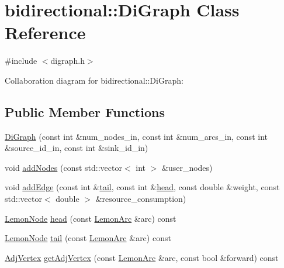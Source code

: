 \hypertarget{classbidirectional_1_1DiGraph}{}\section{bidirectional\+:\+:Di\+Graph Class Reference}
\label{classbidirectional_1_1DiGraph}


{\ttfamily \#include $<$digraph.\+h$>$}



Collaboration diagram for bidirectional\+:\+:Di\+Graph\+:
\subsection*{Public Member Functions}
\begin{DoxyCompactItemize}
\item 
\hyperlink{classbidirectional_1_1DiGraph_a8c15d18a0760e40039441081aa88a51b}{Di\+Graph} (const int \&num\+\_\+nodes\+\_\+in, const int \&num\+\_\+arcs\+\_\+in, const int \&source\+\_\+id\+\_\+in, const int \&sink\+\_\+id\+\_\+in)
\item 
void \hyperlink{classbidirectional_1_1DiGraph_a483c50e9b5b483472ae7ee2910f3bcda}{add\+Nodes} (const std\+::vector$<$ int $>$ \&user\+\_\+nodes)
\item 
void \hyperlink{classbidirectional_1_1DiGraph_acc46372f63c1736a81a11b6b533c564b}{add\+Edge} (const int \&\hyperlink{classbidirectional_1_1DiGraph_a0be9d9f87409f523306babcfef8a7f46}{tail}, const int \&\hyperlink{classbidirectional_1_1DiGraph_aa0379cf603a76b85a8ef3ca5ad03d4af}{head}, const double \&weight, const std\+::vector$<$ double $>$ \&resource\+\_\+consumption)
\item 
\hyperlink{digraph_8h_a952c6b935f7521c3435dbd13b255246b}{Lemon\+Node} \hyperlink{classbidirectional_1_1DiGraph_aa0379cf603a76b85a8ef3ca5ad03d4af}{head} (const \hyperlink{digraph_8h_a0f10c67f03c054baec3e3bab6a92171e}{Lemon\+Arc} \&arc) const
\item 
\hyperlink{digraph_8h_a952c6b935f7521c3435dbd13b255246b}{Lemon\+Node} \hyperlink{classbidirectional_1_1DiGraph_a0be9d9f87409f523306babcfef8a7f46}{tail} (const \hyperlink{digraph_8h_a0f10c67f03c054baec3e3bab6a92171e}{Lemon\+Arc} \&arc) const
\item 
\hyperlink{structbidirectional_1_1AdjVertex}{Adj\+Vertex} \hyperlink{classbidirectional_1_1DiGraph_a5cd2ea6516bd348ca542115cbc94b239}{get\+Adj\+Vertex} (const \hyperlink{digraph_8h_a0f10c67f03c054baec3e3bab6a92171e}{Lemon\+Arc} \&arc, const bool \&forward) const

\end{DoxyCompactItemize}
